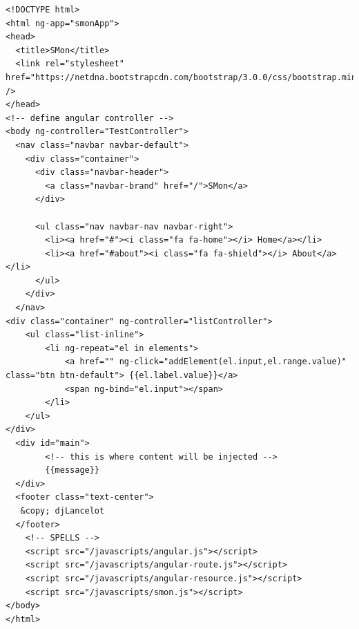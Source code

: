   \begin{lstlisting}[caption={Angular webpage\label{fig:angular}}]
<!DOCTYPE html>
<html ng-app="smonApp">
<head>
  <title>SMon</title>
  <link rel="stylesheet" href="https://netdna.bootstrapcdn.com/bootstrap/3.0.0/css/bootstrap.min.css" />
</head>
<!-- define angular controller -->
<body ng-controller="TestController">
  <nav class="navbar navbar-default">
    <div class="container">
      <div class="navbar-header">
        <a class="navbar-brand" href="/">SMon</a>
      </div>

      <ul class="nav navbar-nav navbar-right">
        <li><a href="#"><i class="fa fa-home"></i> Home</a></li>
        <li><a href="#about"><i class="fa fa-shield"></i> About</a></li>
      </ul>
    </div>
  </nav>
<div class="container" ng-controller="listController">
	<ul class="list-inline">
		<li ng-repeat="el in elements">
			<a href="" ng-click="addElement(el.input,el.range.value)" class="btn btn-default"> {{el.label.value}}</a> 
			<span ng-bind="el.input"></span>
		</li>
	</ul>
</div>
  <div id="main">
		<!-- this is where content will be injected -->
		{{message}}    
  </div>
  <footer class="text-center">
   &copy; djLancelot
  </footer>
    <!-- SPELLS -->
	<script src="/javascripts/angular.js"></script>
	<script src="/javascripts/angular-route.js"></script>
	<script src="/javascripts/angular-resource.js"></script>
	<script src="/javascripts/smon.js"></script>
</body>
</html>
  \end{lstlisting}